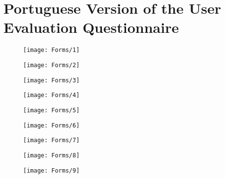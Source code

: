 
%

\chapter{Portuguese Version of the User Evaluation Questionnaire}
\label{app:covers_showcase}

\begin{figure}
    \centering
    \texttt{[image: Forms/1]}
\end{figure}

\begin{figure}
    \centering
    \texttt{[image: Forms/2]}
\end{figure}

\begin{figure}
    \centering
    \texttt{[image: Forms/3]}
\end{figure}

\begin{figure}
    \centering
    \texttt{[image: Forms/4]}
\end{figure}

\begin{figure}
    \centering
    \texttt{[image: Forms/5]}
\end{figure}

\begin{figure}
    \centering
    \texttt{[image: Forms/6]}
\end{figure}

\begin{figure}
    \centering
    \texttt{[image: Forms/7]}
\end{figure}

\begin{figure}
    \centering
    \texttt{[image: Forms/8]}
\end{figure}


\begin{figure}[h!]
    \centering
    \texttt{[image: Forms/9]}
\end{figure}

